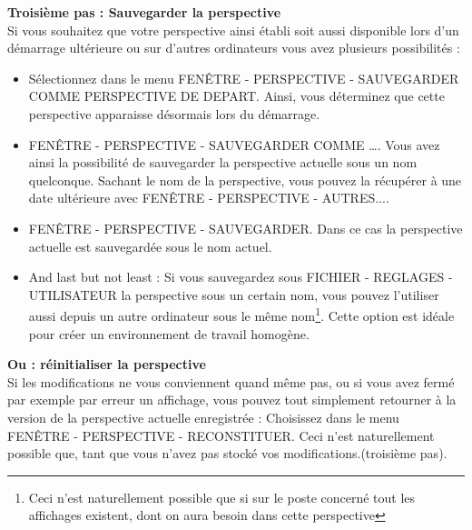\bigskip
\textbf{Troisième pas : Sauvegarder la perspective}\\
Si vous souhaitez que votre perspective ainsi établi soit aussi disponible lors d'un démarrage ultérieure ou sur d'autres ordinateurs vous avez plusieurs possibilités :
\begin{itemize}
\item Sélectionnez dans le menu  \textsc{FENÊTRE - PERSPECTIVE - SAUVEGARDER COMME PERSPECTIVE DE DEPART}. Ainsi, vous déterminez que cette perspective apparaisse désormais lors du démarrage.
\item \textsc{FENÊTRE - PERSPECTIVE - SAUVEGARDER COMME …}. Vous avez ainsi la possibilité de sauvegarder la perspective actuelle sous un nom quelconque. Sachant le nom de la perspective, vous pouvez la récupérer à une date ultérieure avec  \textsc{FENÊTRE - PERSPECTIVE - AUTRES...}.
\item \textsc{FENÊTRE - PERSPECTIVE - SAUVEGARDER}. Dans ce cas la perspective actuelle est sauvegardée sous le nom actuel.
\item And last but not least : Si vous sauvegardez sous \textsc{FICHIER - REGLAGES - UTILISATEUR} la perspective sous un certain nom, vous pouvez l'utiliser aussi depuis un autre ordinateur sous le même nom\footnote{Ceci n'est naturellement possible que si sur le poste concerné tout les affichages existent, dont on aura besoin dans cette perspective}. Cette option est idéale pour créer un environnement de travail homogène.
\end{itemize}

\textbf{Ou : réinitialiser la perspective}\\
Si les modifications ne vous conviennent quand même pas, ou si vous avez fermé
par exemple par erreur un affichage, vous pouvez tout simplement retourner
à la version de la perspective actuelle enregistrée : Choisissez dans le menu
\textsc{FENÊTRE - PERSPECTIVE - RECONSTITUER.} Ceci n'est naturellement possible que, tant que
vous n'avez pas stocké vos modifications.(troisième pas).


